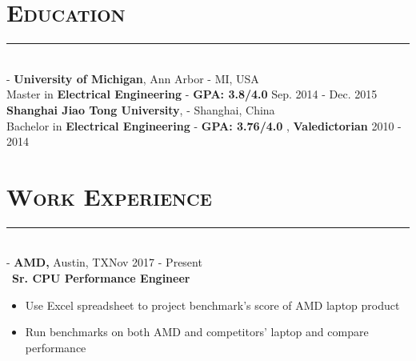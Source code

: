 \documentclass[12pt]{res}
\newcommand{\style}[1]{\color{Blue}\large\textsc{#1}}
\begin{document}
\begin{resume}
\section{\style{Education}}
\rule{18cm}{0.5mm}\\
 -\sectionwidth \resumewidth
{\textbf {University of Michigan}, Ann Arbor - MI, USA \\}
{Master in \textbf{Electrical Engineering} - \textbf{GPA: 3.8/4.0}  \hfill Sep. 2014 - Dec. 2015\hspace{-0.58in} \\}
{\textbf {Shanghai Jiao Tong University},  - Shanghai, China \\}
{Bachelor in \textbf{Electrical Engineering} - \textbf{GPA: 3.76/4.0} , \textbf{Valedictorian}   \hfill 2010 - 2014\hspace{-0.58in} \\}

\section{\style{Work Experience}}

\vspace{-10pt}
\rule{18cm}{0.5mm}\\
 -\sectionwidth \resumewidth
{\textbf{AMD,}  Austin, TX\hfill Nov 2017 - Present} \hspace{-0.58in}\vspace{-0mm}\\\
  \textbf{Sr. CPU Performance Engineer} \\
 \vspace{-14pt}
 \begin{itemize}[leftmargin=-0.1in]
   \item Use Excel spreadsheet to project benchmark's score of AMD laptop product
   \item Run benchmarks on both AMD and competitors' laptop and compare performance 
  \end{itemize}
\vspace{-10pt}


\end{resume}
\end{document}

